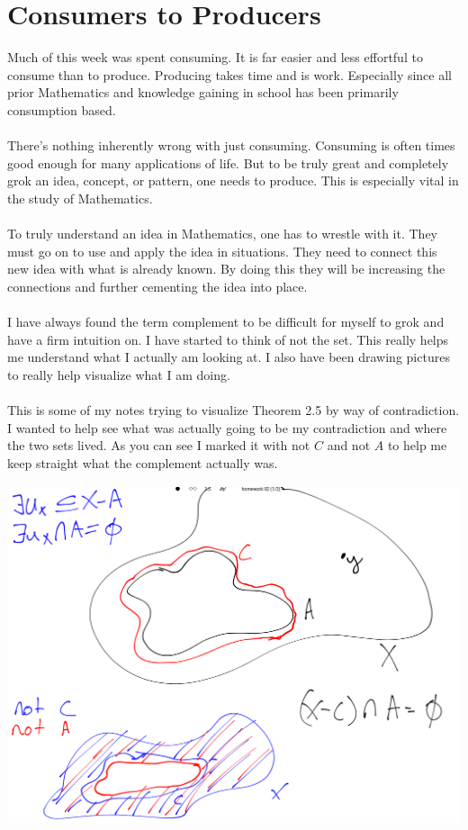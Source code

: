 \documentclass[10pt]{article}
\begin{document}
\section{Consumers to Producers}
Much of this week was spent consuming. It is far easier and less effortful to consume than to produce. Producing takes time and is work. Especially since all prior Mathematics and knowledge gaining in school has been primarily consumption based. \\
\\
There's nothing inherently wrong with just consuming. Consuming is often times good enough for many applications of life. But to be truly great and completely grok an idea, concept, or pattern, one needs to produce. This is especially vital in the study of Mathematics. \\
\\
To truly understand an idea in Mathematics, one has to wrestle with it. They must go on to use and apply the idea in situations. They need to connect this new idea with what is already known. By doing this they will be increasing the connections and further cementing the idea into place.\\
\\ 
I have always found the term complement to be difficult for myself to grok and have a firm intuition on. I have started to think of not the set. This really helps me understand what I actually am looking at. I also have been drawing pictures to really help visualize what I am doing. \\
\\
This is some of my notes trying to visualize Theorem 2.5 by way of contradiction. I wanted to help see what was actually going to be my contradiction and where the two sets lived. As you can see I marked it with not $ C $ and not $A $ to help me keep straight what the complement actually was.\\
\begin{center}
\includegraphics[height=10cm]{thm2.5.png}
\end{center}
\end{document}

